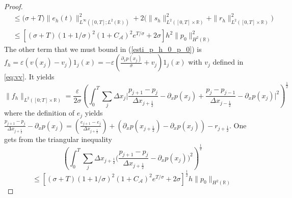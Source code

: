 \documentclass[a4paper,french,english,10pt]{article}
\newcommand\eps{\varepsilon}
\newcommand\V{\mathbf{V}}
\begin{document}
\begin{proof}
\begin{equation*}
\begin{aligned}
&\leq \big( \sigma+T \big) \| e_h(t)\|_{L^\infty([0,T];L^2(\mathbb{R}))}^2+
2\bigg(  \| %
s_h\|_{L^2([0,T]\times\mathbb{R})}^2 +   \|%
r_h\|_{L^2([0,T]\times\mathbb{R})}^2 \bigg)  \\
& \leq \left[  (\sigma+T)
(1+1/\sigma) ^2\left(
 1
+ C_\mathcal A 
\right)^2
  e^{T/\sigma} +2\sigma \right]h^2  \| p_0 \| _{H^2(\mathbb{R})}^2
\end{aligned}
\end{equation*}
%
The other term 
that we must bound in (\ref{esti_p_h_0_p_0})  is
$
f_h=\eps\left(v(x_j)-v_j    \right)1_j(x) = - \eps
\left(  \frac{\partial_x p(x_j)}{\sigma} + v_j  \right)1_j(x)$ with  $v_j$ defined in \eqref{eq:vv}. It  yields
\begin{equation}\label{norme_fh_1D}
\| f_h \|_{L^2([0;T]\times \mathbb{R})} = \frac{\eps}{2\sigma}
\left(  \int_0^T \sum_j \Delta x_j \bigg| \frac{p_{j+1}-p_j}{\Delta x_{j+\frac12}} - \partial_x p(x_j) + \frac{p_{j}-p_{j-1}}{\Delta x_{j-\frac12}} - \partial_x p(x_j) \bigg|^2  \right)^\frac12
\end{equation}
where the definition of $e_j$ yields $\frac{p_{j+1}-p_j}{\Delta x_{j+\frac12}}-\partial_x p(x_{j})=
\left( \frac{e_{j+1}-e_j}{\Delta x_{j+\frac12 }} \right)  + \left(  \partial_x p(x_{j+\frac12}) - \partial_x p(x_{j})  \right) - r_{j+\frac12}$.
 One gets from the triangular inequality 
$$
\left( \int_0^T \sum_j \Delta x_{j+\frac12 } \bigg( \frac{p_{j+1}-p_{j}}{\Delta x_{j+\frac12 }} -\partial_x p(x_{j})  \bigg)^2 \right)^\frac12
$$
$$
  \leq  
   \left[  (\sigma+T)
(1+1/\sigma) ^2\left(
 1
+ C_\mathcal A 
\right)^2
  e^{T/\sigma} +2\sigma \right] ^\frac12  h  \| p_0 \| _{H^2(\mathbb{R})}
$$
\end{proof}
\end{document}
